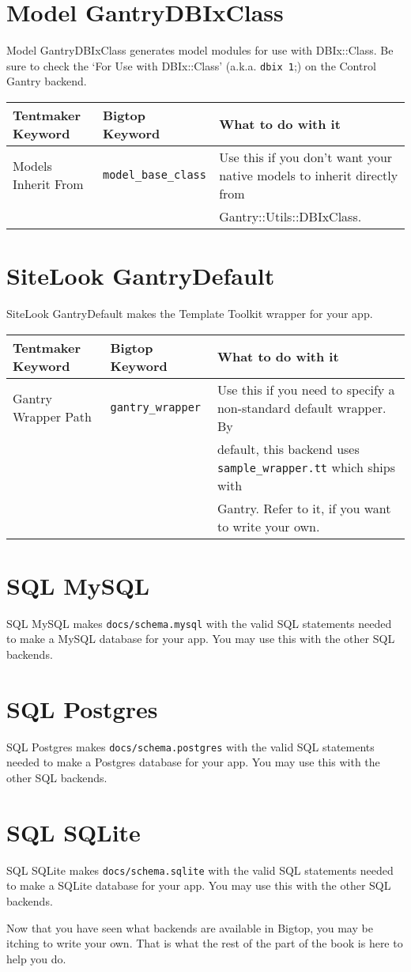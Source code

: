 \section{Model GantryDBIxClass}

Model GantryDBIxClass generates model modules for use with DBIx::Class.
Be sure to check the `For Use with DBIx::Class' (a.k.a. \verb+dbix 1+;)
on the Control Gantry backend.

\begin{tabular}{l|l|l}
Tentmaker Keyword & Bigtop Keyword & What to do with it \\
\hline
Models Inherit From & \verb+model_base_class+ &
    Use this if you don't want your native models to inherit directly from \\
& & Gantry::Utils::DBIxClass.
\end{tabular}

\section{SiteLook GantryDefault}

SiteLook GantryDefault makes the Template Toolkit wrapper for your app.

\begin{tabular}{l|l|l}
Tentmaker Keyword & Bigtop Keyword & What to do with it \\
\hline
Gantry Wrapper Path & \verb+gantry_wrapper+ &
    Use this if you need to specify a non-standard default wrapper.  By  \\
& & default, this backend uses \verb+sample_wrapper.tt+ which ships with \\
& & Gantry.  Refer to it, if you want to write your own.
\end{tabular}

\section{SQL MySQL}

SQL MySQL makes \verb+docs/schema.mysql+ with the valid SQL statements
needed to make a MySQL database for your app.  You may use this with
the other SQL backends.

\section{SQL Postgres}

SQL Postgres makes \verb+docs/schema.postgres+ with the valid SQL statements
needed to make a Postgres database for your app.  You may use this with
the other SQL backends.

\section{SQL SQLite}

SQL SQLite makes \verb+docs/schema.sqlite+ with the valid SQL statements
needed to make a SQLite database for your app.  You may use this with
the other SQL backends.

Now that you have seen what backends are available in Bigtop, you may
be itching to write your own.  That is what the rest of the part of the
book is here to help you do.

